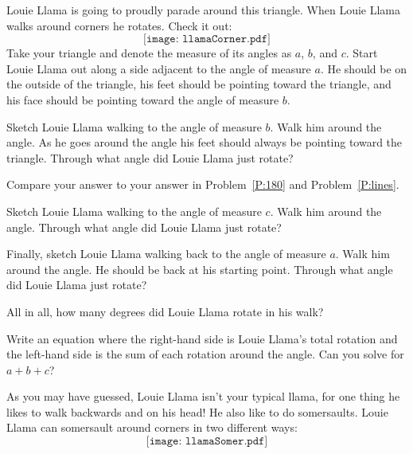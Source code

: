 \documentclass[handout,nooutcomes,noauthor]{ximera}
\begin{document}
Louie Llama is going to proudly parade around this triangle. When
Louie Llama walks around corners he rotates. Check it out:
\[
\texttt{[image: llamaCorner.pdf]}
\]
Take your triangle and denote the measure of its angles as $a$, $b$,
and $c$. Start Louie Llama out along a side adjacent to the angle of
measure $a$. He should be on the outside of the triangle, his feet
should be pointing toward the triangle, and his face should be
pointing toward the angle of measure $b$.




\begin{problem} 
Sketch Louie Llama walking to the angle of measure $b$. Walk him
around the angle. As he goes around the angle his feet should always
be pointing toward the triangle. Through what angle did Louie Llama
just rotate?


\begin{hint}
  Compare your answer to your answer in Problem~\ref{P:180} and
  Problem~\ref{P:lines}.
\end{hint}

\end{problem}

\begin{problem}
Sketch Louie Llama walking to the angle of measure $c$. Walk him
around the angle. Through what angle did Louie Llama just rotate?
\end{problem}

\begin{problem}
Finally, sketch Louie Llama walking back to the angle of measure
$a$. Walk him around the angle. He should be back at his starting
point. Through what angle did Louie Llama just rotate?
\end{problem}

\begin{problem} 
All in all, how many degrees did Louie Llama rotate in his walk?
\end{problem}

\begin{problem} 
Write an equation where the right-hand side is Louie Llama's total
rotation and the left-hand side is the sum of each rotation around the
angle. Can you solve for $a+b+c$?
\end{problem}

As you may have guessed, Louie Llama isn't your typical llama, for one
thing he likes to walk backwards and on his head! He also like to do
somersaults. Louie Llama can somersault around corners in two
different ways:
\[
\texttt{[image: llamaSomer.pdf]}
\]
\end{document}
